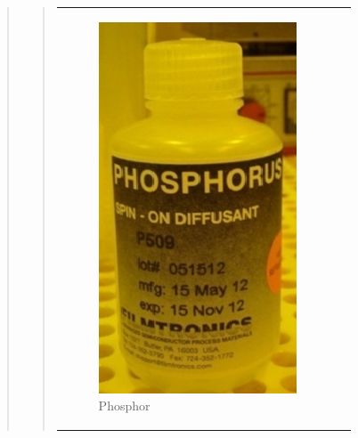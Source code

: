 \begin{quote}
\begin{quote}
\begin{center}
\begin{tabular}{ll}
                \hspace{-14em}
                    \begin{minipage}{0.6\textwidth}
                        \begin{figure}[H]
                        \hspace{8em}
                            \includegraphics[scale=0.7, trim = 0cm 0cm 0cm
                            0cm, clip]{./HerstellungBilder/Phosphorus.png}
                            \caption{Phosphor}
                           \label{fig:phos}
                        \end{figure}

                    \end{minipage}
                    \begin{minipage}{0.6\textwidth}


\end{minipage}
\end{tabular}
\end{center}
\end{quote}
\end{quote}
